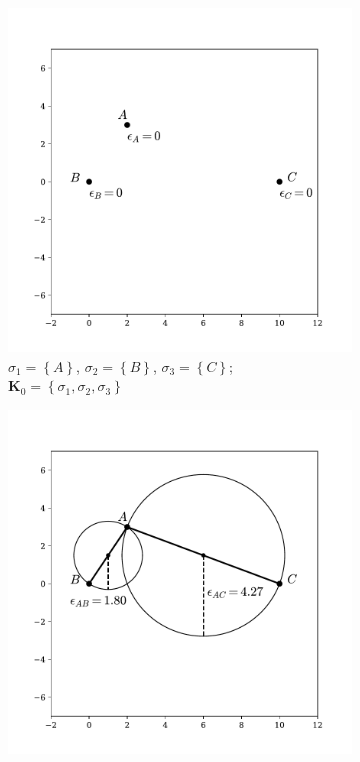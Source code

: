 \begin{figure}[tb]
	\centering
     
	\begin{subfigure}[b]{0.45\textwidth}
         \centering
         \includegraphics[width=\textwidth]{./figures/ph/alpha_a.pdf}
          \caption{$\sigma_1=\left\{A\right\}$, $\sigma_2=\left\{B\right\}$, $\sigma_3=\left\{C\right\}$; \\ $\mathbf{K}_0 = \left\{\sigma_1,\sigma_2,\sigma_3\right\}$}
         \label{fig:phalphaa}
     \end{subfigure}
     \hfill  
       \begin{subfigure}[b]{0.45\textwidth}
         \centering
         \includegraphics[width=\textwidth]{./figures/ph/alpha_b2.pdf}

\end{subfigure}
\end{figure}

